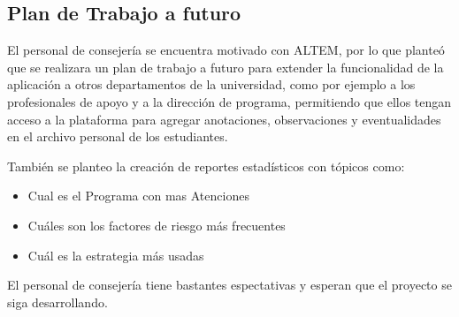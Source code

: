 \subsection{Plan de Trabajo a futuro}
El personal de consejería se encuentra motivado con ALTEM, por lo que planteó que se realizara un plan de trabajo a futuro para extender la funcionalidad de la aplicación a otros departamentos de la universidad, como por ejemplo a los profesionales de apoyo y a la dirección de programa, permitiendo que ellos tengan acceso a la plataforma para agregar anotaciones, observaciones y eventualidades en el archivo personal de los estudiantes. 

También se planteo la creación de reportes estadísticos con tópicos como:

\begin{itemize}
    \item Cual es el Programa con mas Atenciones
    \item Cuáles son los factores de riesgo más frecuentes
    \item Cuál es la estrategia más usadas
\end{itemize}

El personal de consejería tiene bastantes espectativas y esperan que el proyecto se siga desarrollando.
